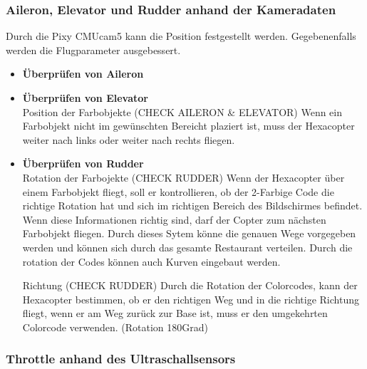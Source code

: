     \subsubsection{Aileron, Elevator und Rudder anhand der Kameradaten}
    Durch die Pixy CMUcam5 kann die Position festgestellt werden. Gegebenenfalls werden die Flugparameter ausgebessert.

      \begin{itemize}

        \item \textbf{Überprüfen von Aileron}\\




        \item \textbf{Überprüfen von Elevator}\\

        Position der Farbobjekte (CHECK AILERON \& ELEVATOR)
        Wenn ein Farbobjekt nicht im gewünschten Bereicht plaziert ist, muss der Hexacopter weiter nach links oder weiter nach rechts fliegen.

        \item \textbf{Überprüfen von Rudder}\\

        Rotation der Farbojekte (CHECK RUDDER)
        Wenn der Hexacopter über einem Farbobjekt fliegt, soll er kontrollieren, ob der 2-Farbige Code die richtige Rotation hat und sich im richtigen Bereich des Bildschirmes befindet. Wenn diese Informationen richtig sind, darf der Copter zum nächsten Farbobjekt fliegen.
        Durch dieses Sytem könne die genauen Wege vorgegeben werden und können sich durch das gesamte Restaurant verteilen. Durch die rotation der Codes können auch Kurven eingebaut werden.



        Richtung (CHECK RUDDER)
        Durch die Rotation der Colorcodes, kann der Hexacopter bestimmen, ob er den richtigen Weg und in die richtige Richtung fliegt, wenn er am Weg zurück zur Base ist, muss er den umgekehrten Colorcode verwenden. (Rotation 180Grad)





      \end{itemize}









    \subsubsection{Throttle anhand des Ultraschallsensors}

